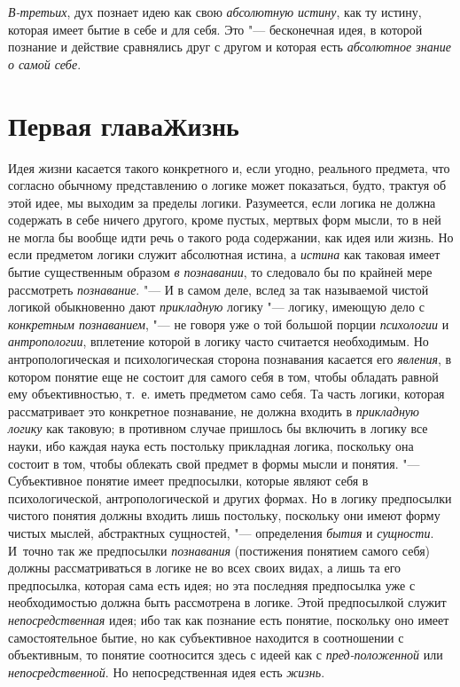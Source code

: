{\em В-третьих}, дух
познает идею как свою {\em абсолютную
истину}, как ту истину, которая имеет бытие в себе и для
себя. Это "--- бесконечная идея, в которой познание и действие
сравнялись друг с другом и которая есть
{\em абсолютное знание о самой себе}.

\chapter[Первая глава Жизнь]{Первая глава\newline Жизнь}
Идея жизни касается такого конкретного и, если угодно,
реального предмета, что согласно обычному представлению о логике может
показаться, будто, трактуя об этой идее, мы выходим за пределы логики.
Разумеется, если логика не должна содержать в себе ничего другого, кроме
пустых, мертвых форм мысли, то в ней не могла бы вообще идти речь о такого
рода содержании, как идея или жизнь. Но если предметом логики служит
абсолютная истина, а {\em истина}
как таковая имеет бытие существенным образом
{\em в познавании}, то
следовало бы по крайней мере рассмотреть {\em познавание}. "--- И в
самом деле, вслед за так называемой чистой логикой обыкновенно дают
{\em прикладную} логику "--- логику, имеющую дело с
{\em конкретным познаванием}, "--- не говоря уже о той большой порции
{\em психологии} и {\em антропологии},
вплетение которой в логику часто считается необходимым. Но
антропологическая и психологическая сторона познавания касается его
{\em явления}, в котором
понятие еще не состоит для самого себя в том, чтобы обладать равной ему
объективностью, т.~е. иметь предметом само себя. Та часть логики, которая
рассматривает это конкретное познавание, не должна входить в
{\em прикладную логику}
как таковую; в противном случае пришлось бы включить в логику
все науки, ибо каждая наука есть постольку прикладная логика, поскольку она
состоит в том, чтобы облекать свой предмет в формы мысли и понятия. "---
Субъективное понятие имеет предпосылки, которые являют себя в
психологической, антропологической и других формах. Но в логику предпосылки
чистого понятия должны входить лишь постольку, поскольку они имеют форму
чистых мыслей, абстрактных сущностей, "--- определения
{\em бытия} и {\em сущности}. И~точно
так же предпосылки {\em познавания}
(постижения понятием самого себя) должны
рассматриваться в логике не во всех своих видах, а лишь та
его предпосылка, которая сама есть идея; но эта последняя предпосылка уже с
необходимостью должна быть рассмотрена в логике. Этой предпосылкой служит
{\em непосредственная}
идея; ибо так как познание есть понятие, поскольку оно имеет
самостоятельное бытие, но как субъективное находится в соотношении с
объективным, то понятие соотносится здесь с идеей как с
{\em пред-положенной} или
{\em непосредственной}.
Но непосредственная идея есть
{\em жизнь}.

